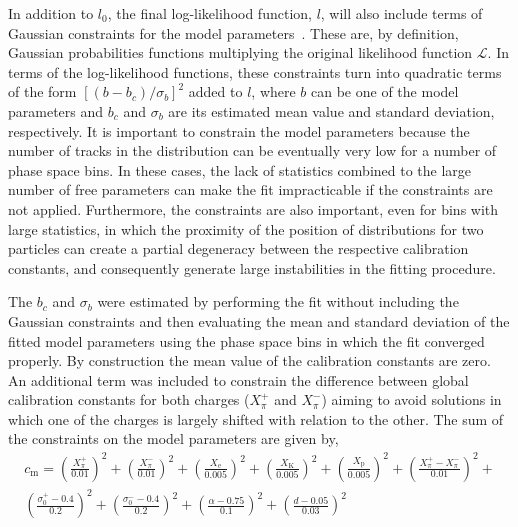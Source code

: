 In addition to $l_0$, the final log-likelihood function, $l$,
will also include terms of Gaussian constraints for the model
parameters~\cite{Karbach:2012vg}. These are, by definition, Gaussian probabilities
functions multiplying the original likelihood function $\mathcal{L}$. 
In terms of the log-likelihood functions, these constraints
turn into quadratic terms of the
form $\left[(b-b_c)/\sigma_b\right]^2$ added to $l$,
where $b$ can be one of the model parameters and 
$b_c$ and $\sigma_b$ are its
estimated mean value and standard deviation, respectively.
It is important to constrain the model parameters because
the number of tracks in the \eps distribution
can be eventually very low for a number of phase space bins.
In these cases, the lack of statistics combined to
the large number of free parameters can make the fit
impracticable if the constraints are not applied.
Furthermore, the constraints are also important,
even for bins with large statistics,
in which the proximity of the position of \eps distributions
for two particles can create a partial degeneracy
between the respective calibration constants,
and consequently
generate large instabilities in the fitting procedure.

The $b_c$ and $\sigma_b$ were
estimated by performing the fit without including
the Gaussian constraints and then evaluating
the mean and standard deviation of the fitted model parameters
using the phase space bins in which the fit converged properly.
By construction the mean value of the calibration constants
are zero. An additional term was included to constrain the
difference between global calibration constants for both
charges ($X_{\pi}^+$ and $X_{\pi}^-$) aiming to avoid solutions
in which one of the charges is largely shifted
with relation to the other.
The sum of the constraints on the model parameters are given by,
\begin{multline}
  c_\text{m} = \left(\frac{X_{\pi}^+}{0.01}\right)^2+\left(\frac{X_{\pi}^-}{0.01}\right)^2+
  \left(\frac{X_\text{e}}{0.005}\right)^2+\left(\frac{X_\text{K}}{0.005}\right)^2+
  \left(\frac{X_\text{p}}{0.005}\right)^2+\left(\frac{X_{\pi}^+-X_{\pi}^-}{0.01}\right)^2+\\
  \left(\frac{\sigma_0^+-0.4}{0.2}\right)^2+\left(\frac{\sigma_0^--0.4}{0.2}\right)^2+
  \left(\frac{\alpha-0.75}{0.1}\right)^2+\left(\frac{d-0.05}{0.03}\right)^2
  \label{eq:hadron:dedx:fit:cm}
\end{multline}

